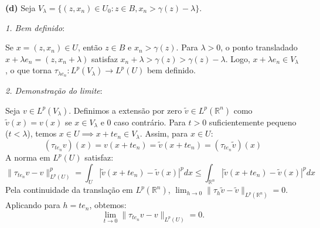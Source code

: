 \documentclass[cs_edp_2026.1.tex]{subfiles} %
\begin{document}
{	\textbf{(d)} Seja $V_\lambda = \{ (z, x_n) \in U_0 : z \in B, x_n > \gamma(z) - \lambda \}$.
	
	\textit{1. Bem definido}:\par
	Se $x = (z, x_n) \in U$, então $z \in B$ e $x_n > \gamma(z)$. Para $\lambda > 0$, o ponto transladado $x + \lambda e_n = (z, x_n + \lambda)$ satisfaz $x_n + \lambda > \gamma(z) > \gamma(z) - \lambda$. Logo, $x + \lambda e_n \in V_\lambda$, o que torna $\tau_{\lambda e_n} : L^p(V_\lambda) \to L^p(U)$ bem definido.
	
	\textit{2. Demonstração do limite}:\par
	Seja $v \in L^p(V_\lambda)$. Definimos a extensão por zero $\tilde{v} \in L^p(\mathbb{R}^n)$ como $\tilde{v}(x) = v(x)$ se $x \in V_\lambda$ e $0$ caso contrário. Para $t > 0$ suficientemente pequeno ($t < \lambda$), temos $x \in U \implies x + t e_n \in V_\lambda$. Assim, para $x \in U$:
	$$(\tau_{t e_n} v)(x) = v(x + t e_n) = \tilde{v}(x + t e_n) = (\tau_{t e_n} \tilde{v})(x)$$
	A norma em $L^p(U)$ satisfaz:
	$$\|\tau_{t e_n} v - v\|_{L^p(U)}^p = \int_U |\tilde{v}(x + t e_n) - \tilde{v}(x)|^p dx \le \int_{\mathbb{R}^n} |\tilde{v}(x + t e_n) - \tilde{v}(x)|^p dx$$
	Pela continuidade da translação em $L^p(\mathbb{R}^n)$, $\lim_{h \to 0} \|\tau_h \tilde{v} - \tilde{v}\|_{L^p(\mathbb{R}^n)} = 0$. Aplicando para $h = t e_n$, obtemos:
	$$\boxed{\lim_{t \to 0} \|\tau_{t e_n} v - v\|_{L^p(U)} = 0}.$$
}


\end{document}

